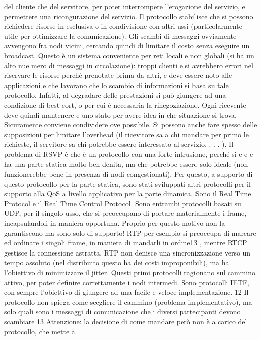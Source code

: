 \documentclass[a4paper,12pt]{article}
\begin{document}
del cliente che del servitore, per poter interrompere l'erogazione del servizio,
e permettere una ricongurazione del servizio. Il protocollo stabilisce che si
possono richiedere risorse in esclusiva o in condivisione con altri ussi (particolarmente utile per ottimizzare la
comunicazione). Gli scambi di messaggi
ovviamente avvengono fra nodi vicini, cercando quindi di limitare il costo senza
eseguire un broadcast.
Questo è un sistema conveniente per reti locali e non globali (si ha un alto nue
mero di messaggi in circolazione): troppi clienti e si avrebbero errori nel riservare
le risorse perché prenotate prima da altri, e deve essere noto alle applicazioni
e
che lavorano che lo scambio di informazioni si basa su tale protocollo. Infatti,
al degradare delle prestazioni si può giungere ad una condizione di best-eort,
o
per cui è necessaria la rinegoziazione. Ogni ricevente deve quindi mantenere
e
uno stato per avere idea in che situazione si trova. Sicuramente conviene condividere ove possibile. Si possono anche
fare spesso delle supposizioni per limitare
l'overhead (il ricevitore sa a chi mandare per primo le richieste, il servitore sa
chi potrebbe essere interessato al servizio, . . . ).
Il problema di RSVP è che è un protocollo con una forte intrusione, perché si
e
e
e
ha una parte statica molto ben denita, ma che potrebbe essere solo ideale (non
funzionerebbe bene in presenza di nodi congestionati). Per questo, a supporto
di questo protocollo per la parte statica, sono stati sviluppati altri protocolli
per il supporto alla QoS a livello applicativo per la parte dinamica. Sono il Real
Time Protocol e il Real Time Control Protocol. Sono entrambi protocolli basati
su UDP, per il singolo usso, che si preoccupano di portare materialmente i
frame, incapsulandoli in maniera opportuna. Proprio per questo motivo non
la garantiscono ma sono solo di supporto! RTP per esempio si preoccupa di
marcare ed ordinare i singoli frame, in maniera di mandarli in ordine13 , mentre
RTCP gestisce la connessione astratta.
RTP non denisce una sincronizzazione verso un tempo assoluto (nel distribuito questo ha dei costi improponibili), ma ha
l'obiettivo di minimizzare il
jitter. Questi primi protocolli ragionano sul cammino attivo, per poter definire
correttamente i nodi intermedi. Sono protocolli IETF, con sempre l'obiettivo di
giungere ad una facile e veloce implementazione.
12 Il protocollo non spiega come scegliere il cammino (problema implementativo), ma solo
quali sono i messaggi di comunicazione che i diversi partecipanti devono scambiare
13 Attenzione: la decisione di come mandare però non è a carico del protocollo, che mette a
\end{document}

